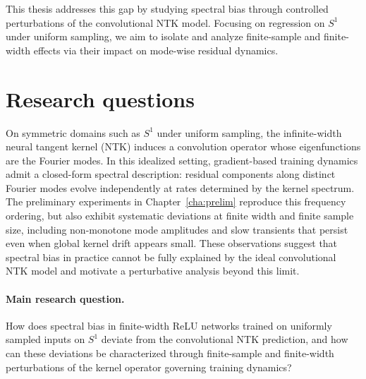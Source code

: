 This thesis addresses this gap by studying spectral bias through controlled
perturbations of the convolutional NTK model. Focusing on regression on $S^1$
under uniform sampling, we aim to isolate and analyze finite-sample and
finite-width effects via their impact on mode-wise residual dynamics.

\section{Research questions}\label{sec:rq}

On symmetric domains such as $S^1$ under uniform sampling, the infinite-width
neural tangent kernel (NTK) induces a convolution operator whose eigenfunctions
are the Fourier modes. In this idealized setting, gradient-based training
dynamics admit a closed-form spectral description: residual components along
distinct Fourier modes evolve independently at rates determined by the kernel
spectrum. The preliminary experiments in Chapter~\ref{cha:prelim} reproduce this
frequency ordering, but also exhibit systematic deviations at finite width and
finite sample size, including non-monotone mode amplitudes and slow transients
that persist even when global kernel drift appears small. These observations
suggest that spectral bias in practice cannot be fully explained by the ideal
convolutional NTK model and motivate a perturbative analysis beyond this limit.

\paragraph{Main research question.}
How does spectral bias in finite-width ReLU networks trained on uniformly sampled
inputs on $S^1$ deviate from the convolutional NTK prediction, and how can these
deviations be characterized through finite-sample and finite-width perturbations
of the kernel operator governing training dynamics?

